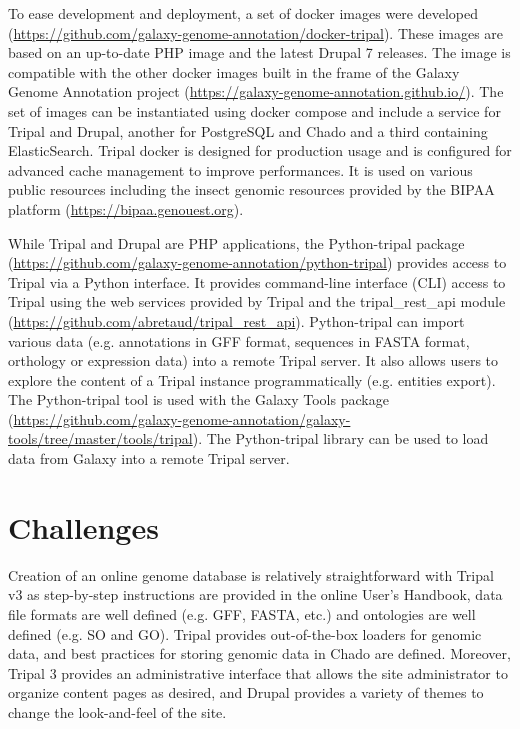 To ease development and deployment, a set of docker images were developed (\url{https://github.com/galaxy-genome-annotation/docker-tripal}). These images are based on an up-to-date PHP image and the latest Drupal 7 releases. The image is compatible with the other docker images built in the frame of the Galaxy Genome Annotation project (\url{https://galaxy-genome-annotation.github.io/}). The set of images can be instantiated using docker compose and include a service for Tripal and Drupal, another for PostgreSQL and Chado and a third containing ElasticSearch. Tripal docker is designed for production usage and is configured for advanced cache management to improve performances. It is used on various public resources including the insect genomic resources provided by the BIPAA platform (\url{https://bipaa.genouest.org}).

While Tripal and Drupal are PHP applications, the Python-tripal package (\url{https://github.com/galaxy-genome-annotation/python-tripal}) provides access to Tripal via a Python interface. It provides command-line interface (CLI) access to Tripal using the web services provided by Tripal and the tripal\_rest\_api module (\url{https://github.com/abretaud/tripal_rest_api}). Python-tripal can import various data (e.g. annotations in GFF format, sequences in FASTA format, orthology or expression data) into a remote Tripal server. It also allows users to explore the content of a Tripal instance programmatically (e.g. entities export). The Python-tripal tool is used with the Galaxy Tools package (\url{https://github.com/galaxy-genome-annotation/galaxy-tools/tree/master/tools/tripal}). The Python-tripal library can be used to load data from Galaxy into a remote Tripal server.


\section*{Challenges}

Creation of an online genome database is relatively straightforward with Tripal v3 as step-by-step instructions are provided in the online User’s Handbook, data file formats are well defined (e.g. GFF, FASTA, etc.) and ontologies are well defined (e.g. SO and GO). Tripal provides out-of-the-box loaders for genomic data, and best practices for storing genomic data in Chado are defined. Moreover, Tripal 3 provides an administrative interface that allows the site administrator to organize content pages as desired, and Drupal provides a variety of themes to change the look-and-feel of the site.

